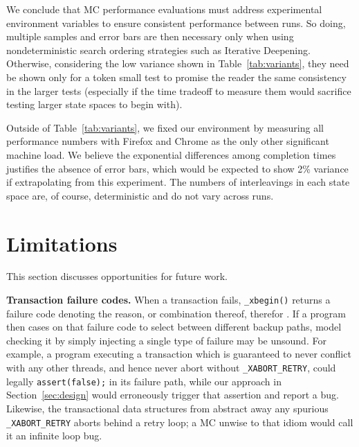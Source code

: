 \documentclass[10pt]{sigplanconf}
\begin{document}
We conclude that MC performance evaluations must address
experimental environment variables
to ensure consistent performance between runs.
So doing, multiple samples and error bars are then necessary
only when using nondeterministic search ordering strategies
such as Iterative Deepening.
Otherwise, considering the low variance shown in Table~\ref{tab:variants},
they need be shown only for a token small test
to promise the reader the same consistency in the larger tests
(especially if the time tradeoff to measure them would sacrifice testing larger state spaces to begin with).

Outside of Table~\ref{tab:variants}, we fixed our environment by measuring all performance numbers
with Firefox and Chrome as the only other significant machine load.
We believe the exponential differences among completion times justifies the absence of error bars,
which would be expected to show 2\% variance if extrapolating from this experiment.
The numbers of interleavings in each state space are, of course, deterministic and do not vary across runs.


\section{Limitations}
\label{sec:warpzone}

This section discusses opportunities for future work.

{\bf Transaction failure codes.}
When a transaction fails, {\tt \_xbegin()} returns a failure code
denoting the reason, or combination thereof, therefor \cite{htm-gcc}.
If a program then cases on that failure code to select between different backup paths,
model checking it by simply injecting a single type of failure may be unsound.
For example, a program executing a transaction which is guaranteed to never conflict with any other threads,
and hence never abort without {\tt \_XABORT\_RETRY},
could legally {\tt assert(false);} in its failure path,
while our approach in Section~\ref{sec:design} would erroneously trigger that assertion and report a bug.
Likewise, the transactional data structures from \cite{htm-mario}
abstract away any spurious {\tt \_XABORT\_RETRY} aborts behind a retry loop;
a MC unwise to that idiom would call it an infinite loop bug.
\end{document}
